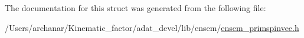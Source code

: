 The documentation for this struct was generated from the following file\+:\begin{DoxyCompactItemize}
\item 
/\+Users/archanar/\+Kinematic\+\_\+factor/adat\+\_\+devel/lib/ensem/\mbox{\hyperlink{lib_2ensem_2ensem__primspinvec_8h}{ensem\+\_\+primspinvec.\+h}}\end{DoxyCompactItemize}
